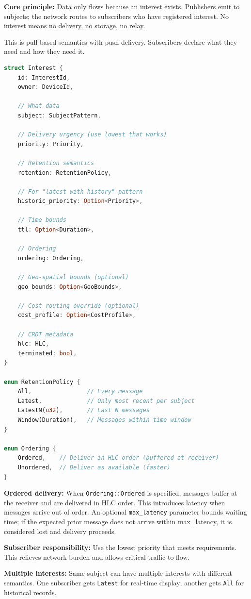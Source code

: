 \textbf{Core principle:} Data only flows because an interest exists. Publishers emit to subjects; the network routes to subscribers who have registered interest. No interest means no delivery, no storage, no relay.

This is pull-based semantics with push delivery. Subscribers declare what they need and how they need it.

\begin{lstlisting}[language=Rust]
struct Interest {
    id: InterestId,
    owner: DeviceId,

    // What data
    subject: SubjectPattern,

    // Delivery urgency (use lowest that works)
    priority: Priority,

    // Retention semantics
    retention: RetentionPolicy,

    // For "latest with history" pattern
    historic_priority: Option<Priority>,

    // Time bounds
    ttl: Option<Duration>,

    // Ordering
    ordering: Ordering,

    // Geo-spatial bounds (optional)
    geo_bounds: Option<GeoBounds>,

    // Cost routing override (optional)
    cost_profile: Option<CostProfile>,

    // CRDT metadata
    hlc: HLC,
    terminated: bool,
}

enum RetentionPolicy {
    All,                // Every message
    Latest,             // Only most recent per subject
    LatestN(u32),       // Last N messages
    Window(Duration),   // Messages within time window
}

enum Ordering {
    Ordered,    // Deliver in HLC order (buffered at receiver)
    Unordered,  // Deliver as available (faster)
}
\end{lstlisting}

\textbf{Ordered delivery:} When \texttt{Ordering::Ordered} is specified, messages buffer at the receiver and are delivered in HLC order. This introduces latency when messages arrive out of order. An optional \texttt{max\_latency} parameter bounds waiting time; if the expected prior message does not arrive within max\_latency, it is considered lost and delivery proceeds.

\textbf{Subscriber responsibility:} Use the lowest priority that meets requirements. This relieves network burden and allows critical traffic to flow.

\textbf{Multiple interests:} Same subject can have multiple interests with different semantics. One subscriber gets \texttt{Latest} for real-time display; another gets \texttt{All} for historical records.

